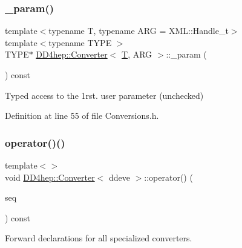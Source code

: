 \subsubsection{\texorpdfstring{\+\_\+param()}{\_param()}}
{\footnotesize\ttfamily template$<$typename T, typename A\+RG = X\+M\+L\+::\+Handle\+\_\+t$>$ \\
template$<$typename T\+Y\+PE $>$ \\
T\+Y\+PE$\ast$ \hyperlink{struct_d_d4hep_1_1_converter}{D\+D4hep\+::\+Converter}$<$ \hyperlink{class_t}{T}, A\+RG $>$\+::\+\_\+param (\begin{DoxyParamCaption}{ }\end{DoxyParamCaption}) const\hspace{0.3cm}{\ttfamily [inline]}}



Typed access to the 1rst. user parameter (unchecked) 



Definition at line 55 of file Conversions.\+h.

\hypertarget{struct_d_d4hep_1_1_converter_a6a73f181b4731dbfc631ab16b9c40bae}{}\label{struct_d_d4hep_1_1_converter_a6a73f181b4731dbfc631ab16b9c40bae} 
\subsubsection{\texorpdfstring{operator()()}{operator()()}\hspace{0.1cm}{\footnotesize\ttfamily [1/22]}}
{\footnotesize\ttfamily template$<$$>$ \\
void \hyperlink{struct_d_d4hep_1_1_converter}{D\+D4hep\+::\+Converter}$<$ ddeve $>$\+::operator() (\begin{DoxyParamCaption}\item[{\hyperlink{_det_factory_helper_8h_ac13b3c79d2bc9214ff0cf5b8dc43dda6}{xml\+\_\+h}}]{seq }\end{DoxyParamCaption}) const}



Forward declarations for all specialized converters. 

\hypertarget{struct_d_d4hep_1_1_converter_a1f9f2d565fedc2a7d2819788d64fc54e}{}\label{struct_d_d4hep_1_1_converter_a1f9f2d565fedc2a7d2819788d64fc54e} 
